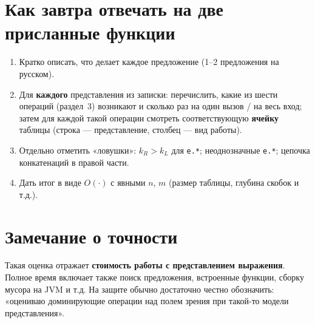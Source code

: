 \documentclass[12pt,a4paper]{article}
\newcommand{\bigO}{\ensuremath{O}}
\begin{document}
\section{Как завтра отвечать на две присланные функции}

\begin{enumerate}
  \item Кратко описать, что делает каждое предложение (1--2 предложения на русском).
  \item Для \textbf{каждого} представления из записки: перечислить, какие из шести операций (раздел~3) возникают и сколько раз на один вызов / на весь вход; затем для каждой такой операции смотреть соответствующую \textbf{ячейку} таблицы (строка --- представление, столбец --- вид работы).
  \item Отдельно отметить «ловушки»: \(k_R > k_L\) для \texttt{e.*}; неоднозначные \texttt{e.*}; цепочка конкатенаций в правой части.
  \item Дать итог в виде \(\bigO(\cdot)\) с явными \(n\), \(m\) (размер таблицы, глубина скобок и т.д.).
\end{enumerate}

\section{Замечание о точности}

Такая оценка отражает \textbf{стоимость работы с представлением выражения}. Полное время включает также поиск предложения, встроенные функции, сборку мусора на JVM и т.д. На защите обычно достаточно честно обозначить: «оцениваю доминирующие операции над полем зрения при такой-то модели представления».
\end{document}
